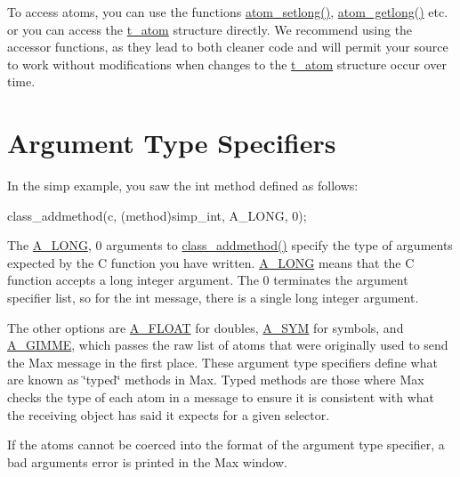 To access atoms, you can use the functions \hyperlink{group__atom_ga98af493b18dfac0f8d441e16e520d5f6}{atom\_\-setlong()}, \hyperlink{group__atom_ga62c0a631f50db54ec654a9e40b992fe2}{atom\_\-getlong()} etc. or you can access the \hyperlink{structt__atom}{t\_\-atom} structure directly. We recommend using the accessor functions, as they lead to both cleaner code and will permit your source to work without modifications when changes to the \hyperlink{structt__atom}{t\_\-atom} structure occur over time.\hypertarget{chapter_atoms_chapter_atoms_types}{}\section{Argument Type Specifiers}\label{chapter_atoms_chapter_atoms_types}
In the simp example, you saw the int method defined as follows: 
\begin{DoxyCode}
        class_addmethod(c, (method)simp_int, A_LONG, 0);
\end{DoxyCode}


The \hyperlink{group__atom_gga8aa6700e9f00b132eb376db6e39ade47a002f28879581a6f66ea492b994b96f1e}{A\_\-LONG}, 0 arguments to \hyperlink{group__class_ga1fabf54e0cec8d4e5f732fa347b3f874}{class\_\-addmethod()} specify the type of arguments expected by the C function you have written. \hyperlink{group__atom_gga8aa6700e9f00b132eb376db6e39ade47a002f28879581a6f66ea492b994b96f1e}{A\_\-LONG} means that the C function accepts a long integer argument. The 0 terminates the argument specifier list, so for the int message, there is a single long integer argument.

The other options are \hyperlink{group__atom_gga8aa6700e9f00b132eb376db6e39ade47a0b3aa0ab8104573dfc9cb70b5b08031f}{A\_\-FLOAT} for doubles, \hyperlink{group__atom_gga8aa6700e9f00b132eb376db6e39ade47a2d661c2a5d949566e2f1944c99bceeea}{A\_\-SYM} for symbols, and \hyperlink{group__atom_gga8aa6700e9f00b132eb376db6e39ade47a81c1a8550f038db16a619167a70a79b6}{A\_\-GIMME}, which passes the raw list of atoms that were originally used to send the Max message in the first place. These argument type specifiers define what are known as \char`\"{}typed\char`\"{} methods in Max. Typed methods are those where Max checks the type of each atom in a message to ensure it is consistent with what the receiving object has said it expects for a given selector.

If the atoms cannot be coerced into the format of the argument type specifier, a bad arguments error is printed in the Max window.

